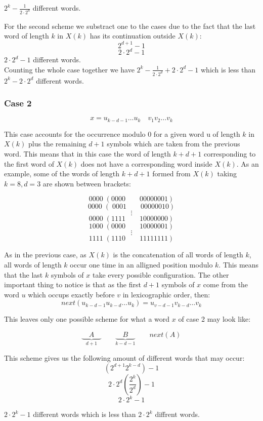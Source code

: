 \documentclass[11pt,a4paper]{tesis}
\theoremstyle{definition}
\begin{document}
$ 2^k - \frac{1}{2\cdot2^{d} }$ different words.

For the second scheme we substract one to the cases due to the fact that the last word of length $k$ in $X(k)$ has its continuation outside $X(k)$:
$$2^{d + 1}   - 1$$
$$2\cdot 2^d - 1$$
$ 2\cdot 2^d - 1 $ different words.
\\

Counting the whole case together we have $  2^k - \frac{1}{2\cdot2^{d} } + 2\cdot 2^d - 1$ which is less than $2^k -  2\cdot 2^d$ different words.

\subsubsection{Case 2}
$$ x = u_{k-d-1} \dots u_k \quad v_1 v_2 \dots v_k$$

This case accounts for the occurrence modulo 0 for a given word u of length $k$ in $X(k)$ plus the remaining $d + 1$ symbols which are taken from the previous word. This means that in this case the word of length $k + d + 1$ corresponding to the first word of $X(k)$ does not have a corresponding word inside $X(k)$.
As an example, some of the words of length $k + d + 1$ formed from $X(k)$ taking $k = 8, d = 3$ are shown between brackets:

$$0000 \; (0000 \qquad 00000001)$$
$$0000 \; ( \; 0001 \qquad 00000010)$$
$$\vdots$$
$$0000 \; (1111 \qquad 10000000)$$
$$1000 \; (0000 \qquad 10000001)$$
$$\vdots$$
$$1111 \; (1110 \qquad 11111111)$$

As in the previous case, as $X(k)$ is the concatenation of all words of length $k$, all words of length $k$ occur one time in an alligned position modulo $k$. This means that the last $k$ symbols of $x$ take every possible configuration.
The other important thing to notice is that as the first $d + 1$ symbols of $x$ come from the word $u$ which occups exactly before $v$ in lexicographic order, then: 
$$next(u_{k-d-1} u_{k-d} \dots u_k) = u_{v-d-1} v_{k-d} \dots v_k$$

This leaves only one possible scheme for what a word $x$ of case 2 may look like:

$$\underbrace{\quad A \quad }_{d +1} \qquad \underbrace{\quad B \quad }_{k - d - 1}  \qquad next(A)$$

This scheme gives us the following amount of different words that may occur:
$$(2^{d + 1} 2^{k-d})-1$$
$$ 2\cdot 2^d  (\frac{2^k}{2^d}) - 1$$
$$ 2 \cdot 2^k - 1$$

$ 2 \cdot 2^k - 1 $ different words which is less than $2 \cdot 2^k$ diffrent words.
\end{document}
